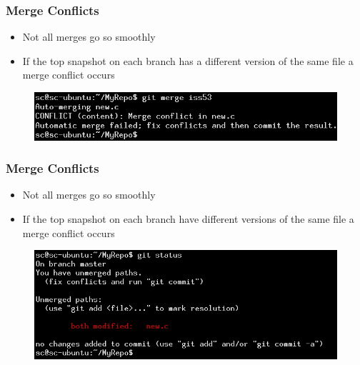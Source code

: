 \documentclass{beamer}
\begin{document}
\begin{frame}
	\frametitle{Merge Conflicts}
	\begin{itemize}
		\item{Not all merges go so smoothly}
		\item{If the top snapshot on each branch has a different version of the same file a merge conflict occurs}
	\end{itemize}
	\begin{figure}
		\includegraphics[scale=0.4]{Merging_Branches-9.png}
	\end{figure}
\end{frame}

\begin{frame}
	\frametitle{Merge Conflicts}
	\begin{itemize}
		\item{Not all merges go so smoothly}
		\item{If the top snapshot on each branch have different versions of the same file a merge conflict occurs}
	\end{itemize}
	\begin{figure}
		\includegraphics[scale=0.38]{Merging_Branches-10.png}
	\end{figure}
\end{frame}
\end{document}
